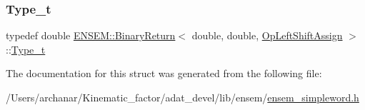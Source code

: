 \mbox{\label{structENSEM_1_1BinaryReturn_3_01double_00_01double_00_01OpLeftShiftAssign_01_4_afd8f7fe1e9c353d307a21e9b6f2e7970}} 
\subsubsection{\texorpdfstring{Type\_t}{Type\_t}\hspace{0.1cm}{\footnotesize\ttfamily [2/2]}}
{\footnotesize\ttfamily typedef double \mbox{\hyperlink{structENSEM_1_1BinaryReturn}{E\+N\+S\+E\+M\+::\+Binary\+Return}}$<$ double, double, \mbox{\hyperlink{structENSEM_1_1OpLeftShiftAssign}{Op\+Left\+Shift\+Assign}} $>$\+::\mbox{\hyperlink{structENSEM_1_1BinaryReturn_3_01double_00_01double_00_01OpLeftShiftAssign_01_4_afd8f7fe1e9c353d307a21e9b6f2e7970}{Type\+\_\+t}}}



The documentation for this struct was generated from the following file\+:\begin{DoxyCompactItemize}
\item 
/\+Users/archanar/\+Kinematic\+\_\+factor/adat\+\_\+devel/lib/ensem/\mbox{\hyperlink{lib_2ensem_2ensem__simpleword_8h}{ensem\+\_\+simpleword.\+h}}\end{DoxyCompactItemize}
